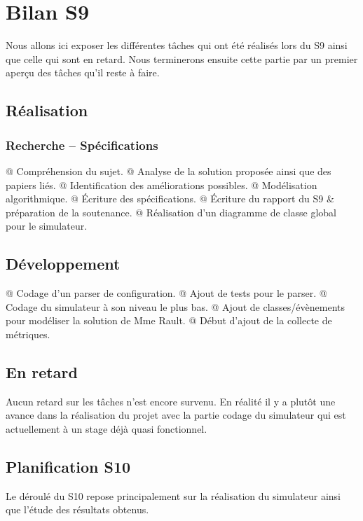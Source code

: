 \documentclass[final]{polytech/polytech}
\begin{document}
	\section{Bilan S9}
		Nous allons ici exposer les différentes tâches qui ont été réalisés lors du S9 ainsi que celle qui sont en retard.
		Nous terminerons ensuite cette partie par un premier aperçu des tâches qu'il reste à faire.
		
		\subsection{Réalisation}
			\subsubsection{Recherche -- Spécifications}
				\begin{easylist}[itemize]
					@ Compréhension du sujet.
					@ Analyse de la solution proposée ainsi que des papiers liés.
					@ Identification des améliorations possibles.
					@ Modélisation algorithmique.
					@ Écriture des spécifications.
					@ Écriture du rapport du S9 \& préparation de la soutenance.
					@ Réalisation d'un diagramme de classe global pour le simulateur.
				\end{easylist}

			\subsection{Développement}
				\begin{easylist}[itemize]
					@ Codage d'un parser de configuration.
					@ Ajout de tests pour le parser.
					@ Codage du simulateur à son niveau le plus bas.
					@ Ajout de classes/évènements pour modéliser la solution de Mme Rault.
					@ Début d'ajout de la collecte de métriques.
				\end{easylist}

		\subsection{En retard}
			Aucun retard sur les tâches n'est encore survenu.
			En réalité il y a plutôt une avance dans la réalisation du projet avec la partie codage du simulateur qui est actuellement à un stage déjà quasi fonctionnel.
			
		\subsection{Planification S10}
			Le déroulé du S10 repose principalement sur la réalisation du simulateur ainsi que l'étude des résultats obtenus.
			
\end{document}
